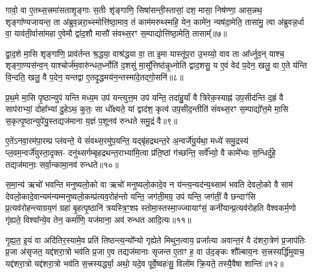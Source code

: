 {\anuvakamend[{गो॒स॒त्त्रं वा ए॑ति सं वथ्स॒रो᳚\-ऽर्धमा॒सा मि॑थु॒नम्म॑ध्य॒तो दे॑व॒याने॑नै॒व वी॒र्य॑न्त्रयो॑दश च॥१॥}]}

गावो॒ वा ए॒तथ्स॒त्त्रमा॑सताशृ॒ङ्गाः स॒तीः शृ॑ङ्गाणि॒ सिषा॑सन्ती॒स्तासां॒ दश॒ मासा॒ निष॑ण्णा॒ आस॒न्नथ॒ शृङ्गा᳚ण्यजायन्त॒ ता अ॑ब्रुव॒न्नरा॒थ्स्मोत्ति॑ष्ठा॒माव॒ तं काम॑मरुथ्स्महि॒ येन॒ कामे॑न॒ न्यष॑दा॒मेति॒ तासा॑मु॒ त्वा अ॑ब्रुवन्न॒र्धा वा॒ याव॑ती॒र्वासा॑महा ए॒वेमौ द्वा॑द॒शौ मासौ॑ संवथ्स॒रꣳ स॒म्पाद्योत्ति॑ष्ठा॒मेति॒ तासाम्᳚॥७॥

द्वा॒द॒शे मा॒सि शृङ्गा॑णि॒ प्राव॑र्तन्त श्र॒द्धया॒ वाश्र॑द्धया वा॒ ता इ॒मा यास्तू॑प॒रा उ॒भय्यो॒ वाव ता आ᳚र्ध्नुव॒न् याश्च॒ शृङ्गा॒ण्यस॑न्व॒न् याश्चोर्ज॑म॒वारु॑न्धत॒र्ध्नोति॑ द॒शसु॑ मा॒सू᳚त्तिष्ठ॑न्नृ॒ध्नोति॑ द्वाद॒शसु॒ य ए॒वं वेद॑ प॒देन॒ खलु॒ वा ए॒ते य॑न्ति वि॒न्दति॒ खलु॒ वै प॒देन॒ यन्तद्वा ए॒तदृ॒द्धमय॑न॒न्तस्मा॑दे॒तद्गो॒सनि॑॥८॥

{\anuvakamend[{ति॒ष्ठा॒मेति॒ तासा॒न्तस्मा॒द्द्वे च॑॥२॥}]}

प्र॒थ॒मे मा॒सि पृ॒ष्ठान्युप॑ यन्ति मध्य॒म उप॑ यन्त्युत्त॒म उप॑ यन्ति॒ तदा॑हु॒र्यां वै त्रिरेक॒स्याह्न॑ उप॒सीद॑न्ति द॒ह्रं वै साप॑राभ्यां॒ दोहा᳚भ्यां दु॒हे\-ऽथ॒ कुतः॒ सा धो᳚क्ष्यते॒ यां द्वाद॑श॒ कृत्व॑ उप॒सीद॒न्तीति॑ संवथ्स॒रꣳ स॒म्पाद्यो᳚त्त॒मे मा॒सि स॒कृत्पृ॒ष्ठान्युपे॑यु॒स्तद्यज॑माना य॒ज्ञं प॒शूनव॑ रुन्धते समु॒द्रं वै॥९॥

ए॒ते॑\-ऽनवा॒रम॑पा॒रम्प्र प्ल॑वन्ते॒ ये सं॑वथ्स॒रमु॑प॒यन्ति॒ यद्बृ॑हद्रथन्त॒रे अ॒न्वर्जे॑यु॒र्यथा॒ मध्ये॑ समु॒द्रस्य॑ प्ल॒वम॒न्वर्जे॑युस्ता॒दृक्त- दनु॑थ्सर्गम्बृहद्रथन्त॒राभ्या॑मि॒त्वा प्र॑ति॒ष्ठां ग॑च्छन्ति॒ सर्वे᳚भ्यो॒ वै कामे᳚भ्यः स॒न्धिर्दु॑हे॒ तद्यज॑मानाः॒ सर्वा॒न्कामा॒नव॑ रुन्धते॥१०॥

{\anuvakamend[{स॒मु॒द्रं वै चतु॑स्त्रिꣳशच्च॥३॥}]}

स॒मा॒न्य॑ ऋचो॑ भवन्ति मनुष्यलो॒को वा ऋचो॑ मनुष्यलो॒कादे॒व न य॑न्त्य॒न्यद॑न्य॒थ्साम॑ भवति देवलो॒को वै साम॑ देवलो॒कादे॒वान्यम॑न्यम्मनुष्यलो॒कम्प्र॑त्यव॒रोह॑न्तो यन्ति॒ जग॑ती॒मग्र॒ उप॑ यन्ति॒ जग॑तीं॒ वै छन्दाꣳ॑सि प्र॒त्यव॑रोहन्त्याग्रय॒णं ग्रहा॑ बृ॒हत्पृ॒ष्ठानि॑ त्रयस्त्रि॒ꣳ॒शꣴ स्तोमा॒स्तस्मा॒ज्ज्यायाꣳ॑सं॒ कनी॑यान्प्र॒त्यव॑रोहति वैश्वकर्म॒णो गृ॑ह्यते॒ विश्वा᳚न्ये॒व तेन॒ कर्मा॑णि॒ यज॑माना॒ अव॑ रुन्धत आदि॒त्यः॥११॥

गृ॒ह्य॒त॒ इ॒यं वा अदि॑तिर॒स्यामे॒व प्रति॑ तिष्ठन्त्य॒न्यो᳚न्यो गृह्येते मिथुन॒त्वाय॒ प्रजा᳚त्या अवान्त॒रं वै द॑शरा॒त्रेण॑ प्र॒जाप॑तिः प्र॒जा अ॑सृजत॒ यद्द॑शरा॒त्रो भव॑ति प्र॒जा ए॒व तद्यज॑मानाः सृजन्त ए॒ताꣳ ह॒ वा उ॑द॒ङ्कः शौ᳚ल्बाय॒नः स॒त्त्रस्यर्द्धि॑मुवाच॒ यद्द॑शरा॒त्रो यद्द॑शरा॒त्रो भव॑ति स॒त्त्रस्यर्द्ध्या॒ अथो॒ यदे॒व पूर्वे॒ष्वहः॑सु॒ विलो॑म क्रि॒यते॒ तस्यै॒वैषा शान्तिः॑॥१२॥

